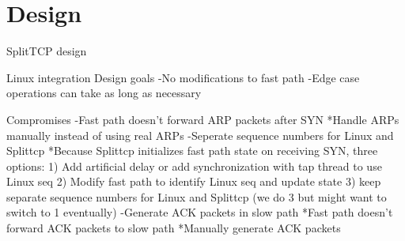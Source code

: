 \section{Design}\label{Design}

SplitTCP design

Linux integration Design goals
 -No modifications to fast path
 -Edge case operations can take as long as necessary

Compromises
 -Fast path doesn't forward ARP packets after SYN
	*Handle ARPs manually instead of using real ARPs
 -Seperate sequence numbers for Linux and Splittcp
    *Because Splittcp initializes fast path state on receiving SYN, three options:
		1) Add artificial delay or add synchronization with tap thread to use Linux seq
		2) Modify fast path to identify Linux seq and update state
		3) keep separate sequence numbers for Linux and Splittcp
		(we do 3 but might want to switch to 1 eventually)
 -Generate ACK packets in slow path
	*Fast path doesn't forward ACK packets to slow path
	*Manually generate ACK packets

